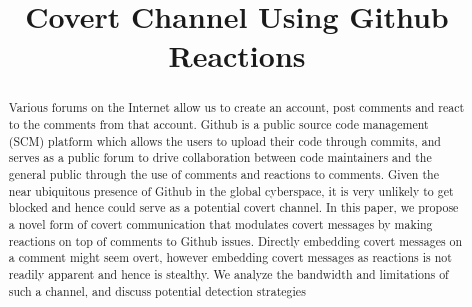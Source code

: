 \documentclass[conference]{IEEEtran}
\begin{document}
\title{Covert Channel Using Github Reactions \\
}

\author{
\and
{}
\and
{}
\and
{}
}

\maketitle

\begin{abstract}
Various forums on the Internet allow us to create an account, post comments and react to the comments from that account. Github is a public source code management (SCM) platform which allows the users to upload their code through commits, and serves as a public forum to drive collaboration between code maintainers and the general public through the use of comments and reactions to comments. Given the near ubiquitous presence of Github in the global cyberspace, it is very unlikely to get blocked and hence could serve as a potential covert channel. In this paper, we propose a novel form of covert communication that modulates covert messages by making reactions on top of comments to Github issues. Directly embedding covert messages on a comment might seem overt, however embedding covert messages as reactions is not readily apparent and hence is stealthy. We analyze the bandwidth and limitations of such a channel, and discuss potential detection strategies

\end{abstract}
\end{document}
